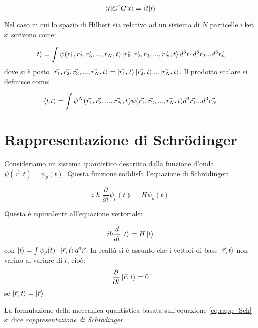 \begin{equation}
\braket{t|G^{\dag}G|t}=\braket{t|t}
\end{equation}

Nel caso in cui lo spazio di Hilbert sia relativo ad un sistema di $N$ particelle i ket si scrivono come:

\begin{equation}
\ket{t}=\int\psi(\vec{r_1},\vec{r_2},\vec{r_3},...,\vec{r_N},t)\ket{\vec{r_1},\vec{r_2},\vec{r_3},...,\vec{r_N},t}d^3\vec{r_1}d^3\vec{r_2}...d^3\vec{r_n}
\end{equation}
dove si è posto $\ket{\vec{r_1},\vec{r_2},\vec{r_3},...,\vec{r_N},t}=\ket{\vec{r_1},t}\ket{\vec{r_2},t}...\ket{\vec{r_N},t}$.
Il prodotto scalare si definisce come:

\begin{equation}
\braket{t|t}=\int\psi^N(\vec{r_1},\vec{r_2},...,\vec{r_N},t)\psi(\vec{r_1},\vec{r_2},...,\vec{r_N},t)d^3\vec{r_1}...d^3\vec{r_N}
\end{equation}


\section{Rappresentazione di Schr\"{o}dinger}
Consideriamo un sistema quantistico descritto dalla funzione d'onda
$\psi(\vec{r},t)=\psi_{p}(t)$. Questa funzione soddisfa l'equazione di
Schr\"{o}dinger:

\begin{equation}
i\hslash\frac{\partial}{\partial t}\psi_{p}(t)=H\psi_{p}(t)
\end{equation}

Questa è equivalente all'equazione vettoriale:

\begin{equation}
i\hslash\frac{d}{dt}\ket{t}=H\ket{t}
\label{eq:rapp_Sch}
\end{equation}
con $\ket{t}=\int\psi_{p}(t)\cdot \ket{\vec{r},t}d^{3}\vec{r}$.
In realtà si è assunto che i vettori di base $\ket{\vec{r},t}$ non varino al
variare di $t$, cioè:
\begin{equation}
\frac{\partial}{\partial t}\ket{\vec{r},t}=0 
\end{equation}
se $\ket{\vec{r},t}=\ket{\vec{r}}$

La formulazione della meccanica quantistica basata sull'equazione
\eqref{eq:rapp_Sch} si dice \textit{rappresentazione di Schr\"{o}dinger}.

